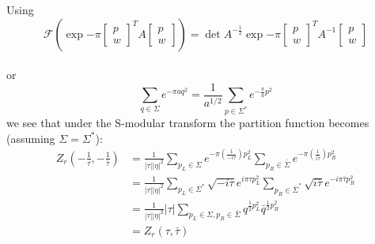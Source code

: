 \documentclass[11pt,aspectratio=169]{beamer}
\begin{document}
\begin{frame}
	Using
	\begin{equation}
		\mathcal{F}(\exp{-\pi\begin{bmatrix} p \\ w \end{bmatrix}^T A \begin{bmatrix} p \\ w \end{bmatrix}}) = \det{A}^{-\frac{1}{2}}\exp{-\pi\begin{bmatrix} p \\ w \end{bmatrix}^T A^{-1} \begin{bmatrix} p \\ w \end{bmatrix}}
	\end{equation}
	\\
	or
	\begin{equation}
		\sum_{q\in \Sigma}e^{-\pi a q^2} = \frac{1}{a^{1/2}}\sum_{p\in \Sigma^*}e^{-\frac{\pi}{a}p^2}
	\end{equation}
	we see that under the S-modular transform the partition function becomes (assuming $\Sigma = \Sigma^*$):
	\begin{align*}
		Z_r (-\frac{1}{\tau}, -\frac{1}{\bar{\tau}}) &= \frac{1}{|\tau||\eta|^2} \sum_{p_L\in\Sigma}e^{-\pi(\frac{1}{-i\tau})p_L^2}\sum_{p_R\in\bar{\Sigma}}e^{-\pi(\frac{1}{i\bar{\tau}})p_R^2} \\
		&= \frac{1}{|\tau||\eta|^2} \sum_{p_L\in\Sigma^*} \sqrt{-i\tau} e^{i\pi\tau p_L^2} \sum_{p_R\in\bar{\Sigma}^*} \sqrt{i\bar{\tau}} e^{-i\pi\bar{\tau}p_R^2} \\
		&= \frac{1}{|\tau||\eta|^2} |\tau| \sum_{p_L\in\Sigma, p_R\in\bar{\Sigma}} q^{\frac{1}{2}p_L^2}\bar{q}^{\frac{1}{2}p_R^2} \\
		&= Z_r (\tau, \bar{\tau})
	\end{align*}
\end{frame}
\end{document}
